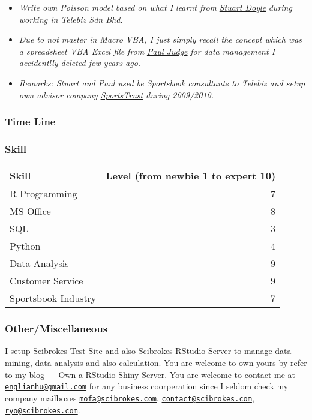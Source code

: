 \documentclass[]{article}
\providecommand{\tightlist}{%
  \setlength{\itemsep}{0pt}\setlength{\parskip}{0pt}}
\begin{document}
\begin{description}
\begin{itemize}
\tightlist
\item
  \emph{Write own Poisson model based on what I learnt from}
  \href{https://www.facebook.com/stuart.doyle1}{\emph{Stuart Doyle}}
  \emph{during working in Telebiz Sdn Bhd.}
\item
  \emph{Due to not master in Macro VBA, I just simply recall the concept
  which was a spreadsheet VBA Excel file from}
  \href{https://www.facebook.com/paul.judge.14}{\emph{Paul Judge}}
  \emph{for data management I accidentlly deleted few years ago.}
\item
  \emph{Remarks: Stuart and Paul used be Sportsbook consultants to
  Telebiz and setup own advisor company
  \href{http://www.sportstrust.com}{SportsTrust} during 2009/2010.}
\end{itemize}
\end{description}

\subsubsection{Time Line}\label{time-line}



\subsubsection{Skill}\label{skill}

\begin{longtable}[c]{@{}lr@{}}
\toprule
Skill & Level (from newbie 1 to expert 10)\tabularnewline
\midrule
\endhead
R Programming & 7\tabularnewline
MS Office & 8\tabularnewline
SQL & 3\tabularnewline
Python & 4\tabularnewline
Data Analysis & 9\tabularnewline
Customer Service & 9\tabularnewline
Sportsbook Industry & 7\tabularnewline
\bottomrule
\end{longtable}

\subsubsection{Other/Miscellaneous}\label{othermiscellaneous}

I setup \href{http://www.scibrokes.com/Test/}{Scibrokes Test Site} and
also \href{http://rstudio.scibrokes.com}{Scibrokes RStudio Server} to
manage data mining, data analysis and also calculation. You are welcome
to own yours by refer to my blog ---
\href{https://englianhu.wordpress.com/statistics/own-a-rstudio-shiny-server/}{Own
a RStudio Shiny Server}. You are welcome to contact me at
\href{mailto:englianhu@gmail.com}{\nolinkurl{englianhu@gmail.com}} for
any business coorperation since I seldom check my company mailboxes
\href{mailto:mofa@scibrokes.com}{\nolinkurl{mofa@scibrokes.com}},
\href{mailto:contact@scibrokes.com}{\nolinkurl{contact@scibrokes.com}},
\href{mailto:ryo@scibrokes.com}{\nolinkurl{ryo@scibrokes.com}}.
\end{document}
